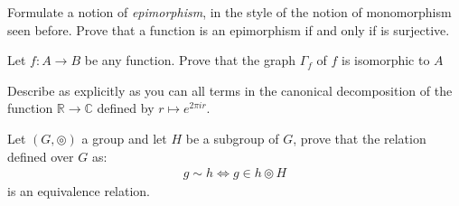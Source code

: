 \documentclass[final,expand]{problemset}
\begin{document}
\problem
Formulate a notion of \textit{epimorphism}, in the style of the notion of monomorphism seen before. Prove that a function is an epimorphism if and only if is surjective.

\solution{

}


\problem
Let $f: A \to B$ be any function. Prove that the graph $\Gamma_f$ of $f$ is isomorphic to $A$


\problem
Describe as explicitly as you can all terms in the canonical decomposition of the function $\mathbb{R} \to \mathbb{C}$ defined by $r \mapsto e^{2\pi i r}$.


\problem
Let $(G, \circledcirc)$ a group and let $H$ be a subgroup of $G$, prove that the relation defined over $G$ as:
\begin{align*}
	g \sim h \Longleftrightarrow g \in h \circledcirc H
\end{align*}
is an equivalence relation.
\end{document}
